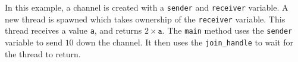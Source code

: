 In this example, a channel is created with a \texttt{sender} and \texttt{receiver} variable. A new thread is spawned which takes ownership of the \texttt{receiver} variable. This thread receives a value \texttt{a}, and returns $2\times\texttt{a}$. The \texttt{main} method uses the \texttt{sender} variable to send $10$ down the channel. It then uses the \texttt{join\_handle} to wait for the thread to return.
